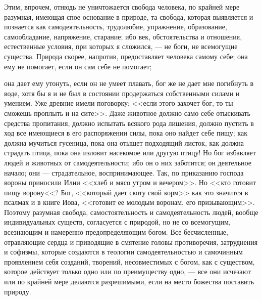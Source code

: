 \documentclass[12pt]{article}
\begin{document}
Этим, впрочем, отнюдь не уничтожается свобода человека, по крайней мере разумная, имеющая спое основание в природе, та свобода, которая выявляется и познается как самодеятельность, трудолюбие, упражнение, образование, самообладание, напряжение, старание; ибо век, обстоятельства и отношения, естественные условия, при которых я сложился, --- не боги, не всемогущие существа. Природа скорее, напротив, предоставляет человека самому себе; она ему не помогает, если он сам себе не помогает; 

она дает ему утонуть, если он не умеет плавать, бог же не дает мне погибнуть в воде, хотя бы я и не был в состоянии продержаться собственными силами и умением. Уже древние имели поговорку: <<если этого захочет бог, то ты сможешь проплыть и на сите>>. Даже животное должно само себе отыскивать средства пропитания, должно испытать всякого рода лишения, должно пустить в ход все имеющиеся в его распоряжении силы, пока оно найдет себе пищу; как должна мучиться гусеница, пока она отыщет подходящий листок, как должна страдать птица, пока она изловит насекомое или другую птицу! Но бог избавляет людей и животных от самодеятельности; ибо он о них заботится; он деятельное начало; они --- страдательное, воспринимающее. Так, по приказанию господа вороны приносили Илии <<хлеб и мясо утром и вечером>>. Но <<кто готовит пищу ворону<<? Бог, <<который дает скоту свой корм>>  как это значится в псалмах и в книге Иова, <<готовит ее молодым воронам, его призывающим>>. Поэтому разумная свобода, самостоятельность и самодеятельность людей, вообще индивидуальных существ, согласуется с природой, но не со всемогущим, всезнающим и намеренно предопределяющим богом. Все бесчисленные, отравляющие сердца и приводящие в смятение головы противоречия, затруднения и софизмы, которые создаются в теологии самодеятельностью и самочинным проявлением себя созданий, творений, несовместимых с богом, как с существом, которое действует только одно или по преимуществу одно, --- все они исчезают или по крайней мере делаются разрешимыми, если на место божества поставить природу. 
\end{document}
